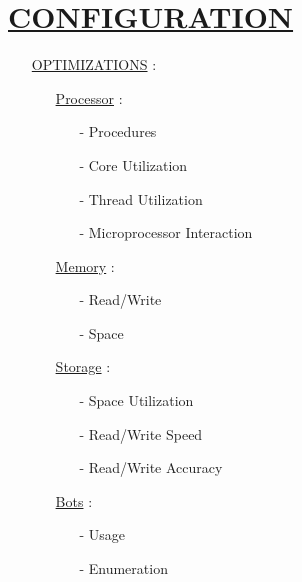 \documentclass[11pt]{article}
\begin{document}
\section*{\ul{CONFIGURATION}}
\begin{enumerate}
	
	\item[] \ul{OPTIMIZATIONS} :
	\begin{enumerate}
		\item[] \ul{Processor}  :
		\begin{enumerate}
			\item[-] Procedures
			\item[-] Core Utilization
			\item[-] Thread Utilization
			\item[-] Microprocessor Interaction
		\end{enumerate}
	
		\item[] \ul{Memory}  :
		\begin{enumerate}
			\item[-] Read/Write
			\item[-] Space
		\end{enumerate}
	
		\item[] \ul{Storage}  :
		\begin{enumerate}
			\item[-] Space Utilization
			\item[-] Read/Write Speed
			\item[-] Read/Write Accuracy
		\end{enumerate}
	
		\item[] \ul{Bots}  :
		\begin{enumerate}
			\item[-] Usage
			\item[-] Enumeration
		\end{enumerate}
	\end{enumerate}

\end{enumerate}
\end{document}
